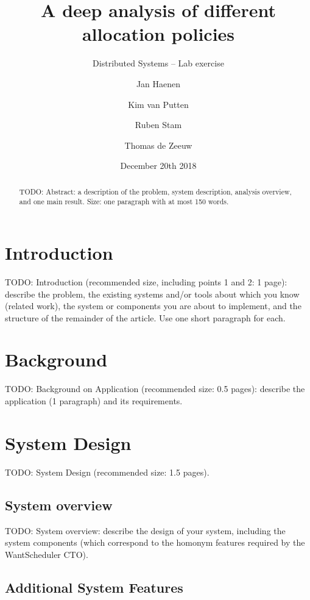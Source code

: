 \documentclass{scrartcl}
\title{A deep analysis of different allocation policies}
\subtitle{Distributed Systems -- Lab exercise}
\author{Jan Haenen \and Kim van Putten \and Ruben Stam \and Thomas de Zeeuw}
\date{December 20th 2018}
\begin{document}
\maketitle

\begin{abstract}

TODO: Abstract: a description of the problem, system description, analysis
overview, and one main result. Size: one paragraph with at most 150 words.

\end{abstract}



\section{Introduction} \label{sec_introduction}

TODO: Introduction (recommended size, including points 1 and 2: 1 page): describe
the problem, the existing systems and/or tools about which you know (related
work), the system or components you are about to implement, and the structure of
the remainder of the article. Use one short paragraph for each.



\section{Background} \label{sec_background}

TODO: Background on Application (recommended size: 0.5 pages): describe the
application (1 paragraph) and its requirements.



\section{System Design} \label{sec_system_design}

TODO: System Design (recommended size: 1.5 pages).


\subsection{System overview} \label{sec_system_overview}

TODO: System overview: describe the design of your system, including the system
components (which correspond to the homonym features required by the
WantScheduler CTO).


\subsection{Additional System Features} \label{sec_system_features}
\end{document}
